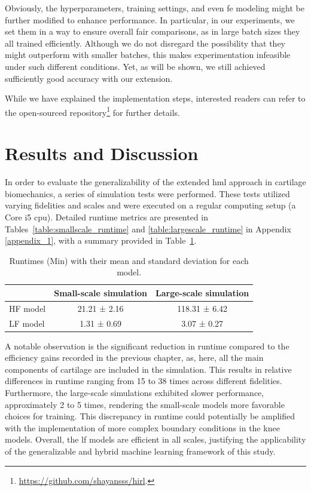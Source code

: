 \documentclass[12pt,a4paper]{report}
\begin{document}
Obviously, the hyperparameters, training settings, and even \ac{fe} modeling might be further modified to enhance performance. In particular, in our experiments, we set them in a way to ensure overall fair comparisons, as in large batch sizes they all trained efficiently. Although we do not disregard the possibility that they might outperform with smaller batches, this makes experimentation infeasible under such different conditions. Yet, as will be shown, we still achieved sufficiently good accuracy with our extension.

While we have explained the implementation steps, interested readers can refer to the open-sourced repository\footnote{\href{https://github.com/shayansss/hirl}{https://github.com/shayansss/hirl}.} for further details.

\section{Results and Discussion}
%
In order to evaluate the generalizability of the extended \ac{hml} approach in cartilage biomechanics, a series of simulation tests were performed. These tests utilized varying fidelities and scales and were executed on a regular computing setup (a Core i5 \ac{cpu}). Detailed runtime metrics are presented in Tables~\ref{table:smallscale_runtime} and \ref{table:largescale_runtime} in Appendix \ref{appendix_1}, with a summary provided in Table~\ref{tabel:runtimes_stats}.
%
\begin{table}[H]
\caption{Runtimes (Min) with their mean and standard deviation for each model.}\centering
\label{tabel:runtimes_stats}
\begin{tabular}{lcc}
\toprule
 & \textbf{Small-scale simulation} & \textbf{Large-scale simulation} \\
\midrule
HF model & 21.21 ± 2.16 & 118.31 ± 6.42 \\
LF model & 1.31 ± 0.69 & 3.07 ± 0.27 \\
\bottomrule
\end{tabular}
\end{table}

A notable observation is the significant reduction in runtime compared to the efficiency gains recorded in the previous chapter, as, here, all the main components of cartilage are included in the simulation. This results in relative differences in runtime ranging from 15 to 38 times across different fidelities. Furthermore, the large-scale simulations exhibited slower performance, approximately 2 to 5 times, rendering the small-scale models more favorable choices for training. This discrepancy in runtime could potentially be amplified with the implementation of more complex boundary conditions in the knee models. Overall, the \ac{lf} models are efficient in all scales, justifying the applicability of the generalizable and hybrid machine learning framework of this study.
\end{document}
